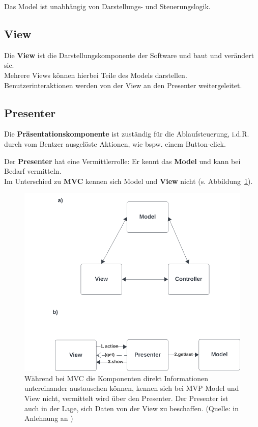 Das Model ist unabhängig von Darstellungs- und Steuerungslogik.

\subsection*{View}

Die \textbf{View} ist die Darstellungskomponente der Software und baut und verändert sie.\\
Mehrere Views können hierbei Teile des Models darstellen.\\
Benutzerinteraktionen werden von der View an den Presenter weitergeleitet.\\

\subsection*{Presenter}
Die \textbf{Präsentationskomponente} ist zuständig für die Ablaufsteuerung, i.d.R. durch vom Bentzer ausgelöste Aktionen, wie bspw. einem Button-click.

\begin{tcolorbox}
Der \textbf{Presenter} hat eine Vermittlerrolle: Er kennt das \textbf{Model} und kann bei Bedarf vermitteln.\\
Im Unterschied zu \textbf{MVC} kennen sich Model und \textbf{View} nicht (s. Abbildung~\ref{fig:mvp}).\\
\end{tcolorbox}

\begin{figure}
    \centering
    \includegraphics[scale=0.5]{chapters/fopt4/img/mvp}
    \caption{Während bei MVC die Komponenten direkt  Informationen untereinander austauschen können, kennen sich bei MVP Model und View nicht, vermittelt wird über den Presenter. Der Presenter ist auch in der Lage, sich Daten von der View zu beschaffen. (Quelle: in Anlehnung an \cite[223, Bild 4.12]{Oec22})}
    \label{fig:mvp}
\end{figure}


